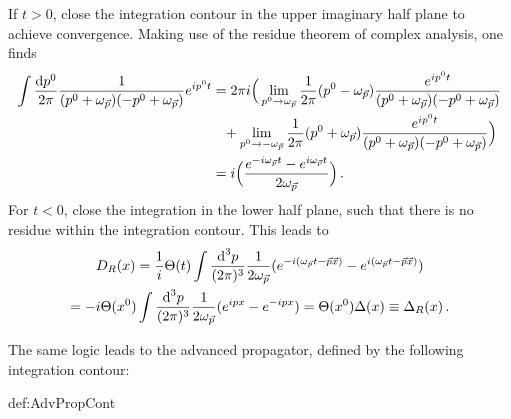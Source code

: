     If $t>0$, close the integration contour in the upper imaginary half plane to achieve convergence. Making use of the residue theorem of complex analysis, one finds
    \begin{align}
        \int\frac{\text{d} p^0}{2\pi}\frac{1}{(p^0+\omega_{\vec{p}})(-p^0+\omega_{\vec{p}})}e^{{i} p^0t}&=2\pi{i}\Big(\lim_{p^0\to\omega_{\vec{p}}}\frac{1}{2\pi}(p^0-\omega_{\vec{p}})\frac{e^{{i} p^0t}}{(p^0+\omega_{\vec{p}})(-p^0+\omega_{\vec{p}})}\nonumber\\
        &\phantom{=}+\lim_{p^0\to-\omega_{\vec{p}}}\frac{1}{2\pi}(p^0+\omega_{\vec{p}})\frac{e^{{i} p^0t}}{(p^0+\omega_{\vec{p}})(-p^0+\omega_{\vec{p}})}\Big)\\
        &={i}\Big(\frac{e^{-{i}\omega_{\vec{p}}t}-e^{{i}\omega_{\vec{p}}t}}{2\omega_{\vec{p}}}\Big)\,.
    \end{align}
    For $t<0$, close the integration in the lower half plane, such that there is no residue within the integration contour. This leads to
    \begin{multline}
        D_R(x)=\frac{1}{{i}}\Theta(t)\int\frac{\text{d}^3p}{(2\pi)^3}\frac{1}{2\omega_{\vec{p}}}(e^{-{i}(\omega_{\vec{p}}t-\vec{p}\vec{x})}-e^{{i}(\omega_{\vec{p}}t-\vec{p}\vec{x})})\\=-{i}\Theta(x^0)\int\frac{\text{d}^3p}{(2\pi)^3}\frac{1}{2\omega_{\vec{p}}}(e^{{i} px}-e^{-{i} px})=\Theta(x^0)\Delta(x)\equiv\Delta_R(x)\,.
    \end{multline}

The same logic leads to the advanced propagator, defined by the following integration contour:
\begin{defin}{def:AdvPropCont}
    \centering
\end{defin}